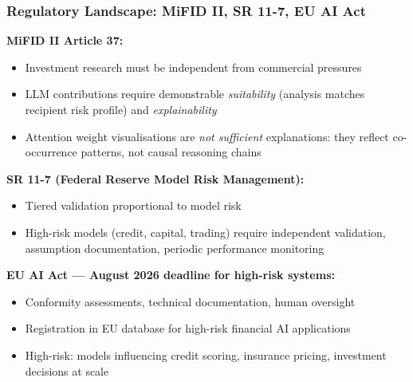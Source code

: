 \documentclass[9pt,t]{beamer}
\begin{document}
\begin{frame}
\frametitle{Regulatory Landscape: MiFID II, SR 11-7, EU AI Act}

\textbf{MiFID II Article 37:}
\begin{itemize}
  \item Investment research must be independent from commercial pressures
  \item LLM contributions require demonstrable \emph{suitability} (analysis
        matches recipient risk profile) and \emph{explainability}
  \item Attention weight visualisations are \emph{not sufficient} explanations:
        they reflect co-occurrence patterns, not causal reasoning chains
\end{itemize}

\medskip
\textbf{SR 11-7 (Federal Reserve Model Risk Management):}
\begin{itemize}
  \item Tiered validation proportional to model risk
  \item High-risk models (credit, capital, trading) require independent
        validation, assumption documentation, periodic performance monitoring
\end{itemize}

\medskip
\textbf{EU AI Act --- August 2026 deadline for high-risk systems:}
\begin{itemize}
  \item Conformity assessments, technical documentation, human oversight
  \item Registration in EU database for high-risk financial AI applications
  \item High-risk: models influencing credit scoring, insurance pricing,
        investment decisions at scale
\end{itemize}
\end{frame}
\end{document}
